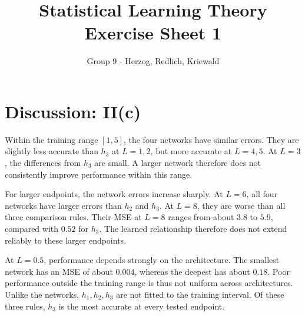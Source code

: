 \documentclass[11pt,a4paper]{article}
\title{Statistical Learning Theory\\Exercise Sheet 1}
\author{Group 9 - Herzog, Redlich, Kriewald}
\date{}
\begin{document}
\maketitle

\section*{Discussion: II(c)}

Within the training range $[1,5]$, the four networks have similar errors.
They are slightly less accurate than $h_3$ at $L=1,2$, but more accurate at
$L=4,5$. At $L=3$, the differences from $h_3$ are small. A larger network
therefore does not consistently improve performance within this range.

For larger endpoints, the network errors increase sharply. At $L=6$, all
four networks have larger errors than $h_2$ and $h_3$. At $L=8$, they are
worse than all three comparison rules. Their MSE at $L=8$ ranges from about
$3.8$ to $5.9$, compared with $0.52$ for $h_3$. The learned relationship
therefore does not extend reliably to these larger endpoints.

At $L=0.5$, performance depends strongly on the architecture. The smallest
network has an MSE of about $0.004$, whereas the deepest has about $0.18$.
Poor performance outside the training range is thus not uniform across
architectures. Unlike the networks, $h_1,h_2,h_3$ are not fitted to the
training interval. Of these three rules, $h_3$ is the most accurate at
every tested endpoint.
\end{document}
